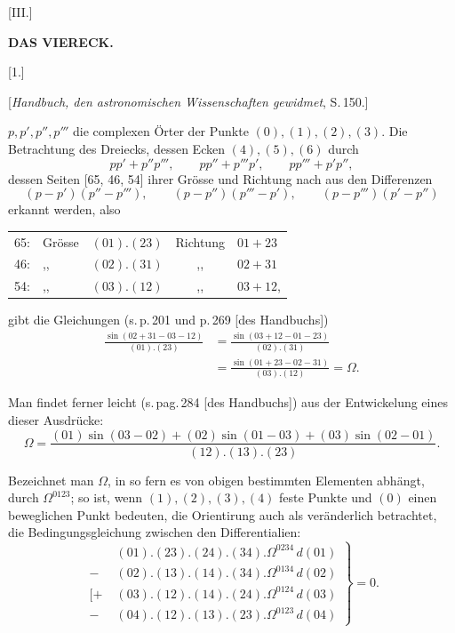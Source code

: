 
\begin{center}
[III.]

\textbf{DAS VIERECK.}

[1.]

[\emph{Handbuch, den astronomischen Wissenschaften gewidmet}, S.\,150.]
\end{center}

$p, p', p'', p'''$ die complexen Örter der Punkte $(0), (1), (2), (3)$. Die Betrachtung des Dreiecks, dessen Ecken $(4), (5), (6)$ durch
\[
pp'+p''p''', \qquad pp''+p'''p', \qquad pp'''+p'p'',
\]
dessen Seiten [65, 46, 54] ihrer Grösse und Richtung nach aus den Differenzen
\[
(p-p')(p''-p'''), \qquad (p-p'')(p'''-p'), \qquad (p-p''')(p'-p'')
\]
erkannt werden, also

\begin{center}
\begin{tabular}{rllcl}
65: & Grösse & $(01).(23)$ & Richtung & $01+23$\\
46: & ,, & $(02).(31)$ & ,, & $02+31$\\
54: & ,, & $(03).(12)$ & ,, & $03+12$,
\end{tabular}
\end{center}

gibt die Gleichungen (s.\,p.\,201 und p.\,269 [des Handbuchs])
\[
\begin{aligned}
\frac{\sin(02+31-03-12)}{(01).(23)} &= \frac{\sin(03+12-01-23)}{(02).(31)}\\
&= \frac{\sin(01+23-02-31)}{(03).(12)} = \Omega.
\end{aligned}
\]

Man findet ferner leicht (s.\,pag.\,284 [des Handbuchs]) aus der Entwickelung eines dieser Ausdrücke:
\[
\Omega = \frac{(01)\sin(03-02)+(02)\sin(01-03)+(03)\sin(02-01)}{(12).(13).(23)}.
\]

Bezeichnet man $\Omega$, in so fern es von obigen bestimmten Elementen abhängt, durch $\Omega^{0123}$; so ist, wenn $(1), (2), (3), (4)$ feste Punkte und $(0)$ einen beweglichen Punkt bedeuten, die Orientirung auch als veränderlich betrachtet, die Bedingungsgleichung zwischen den Differentialien:
\[
\left.
\begin{aligned}
&(01).(23).(24).(34).\Omega^{0234}\,d(01)\\
-\;&(02).(13).(14).(34).\Omega^{0134}\,d(02)\\
[+\;&(03).(12).(14).(24).\Omega^{0124}\,d(03)\\
-\;&(04).(12).(13).(23).\Omega^{0123}\,d(04)
\end{aligned}
\right\} = 0.
\]
